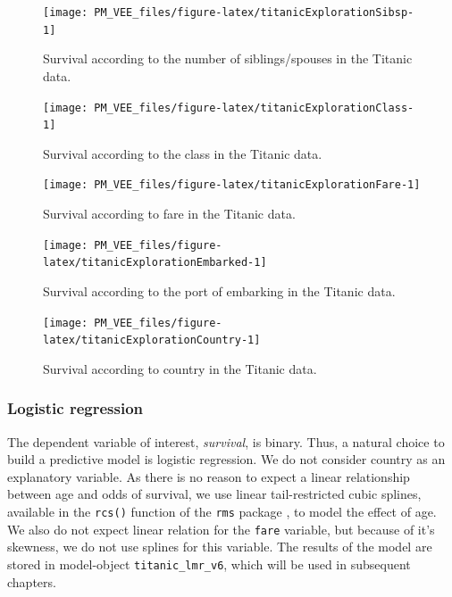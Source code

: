 \documentclass[12pt,]{krantz}
\begin{document}
\begin{figure}

{\centering \texttt{[image: PM\_VEE\_files/figure-latex/titanicExplorationSibsp-1]} 

}

\caption{Survival according to the number of siblings/spouses in the Titanic data.}\label{fig:titanicExplorationSibsp}
\end{figure}
\begin{figure}

{\centering \texttt{[image: PM\_VEE\_files/figure-latex/titanicExplorationClass-1]} 

}

\caption{Survival according to the class in the Titanic data.}\label{fig:titanicExplorationClass}
\end{figure}

\begin{figure}

{\centering \texttt{[image: PM\_VEE\_files/figure-latex/titanicExplorationFare-1]} 

}

\caption{Survival according to fare in the Titanic data.}\label{fig:titanicExplorationFare}
\end{figure}

\begin{figure}

{\centering \texttt{[image: PM\_VEE\_files/figure-latex/titanicExplorationEmbarked-1]} 

}

\caption{Survival according to the port of embarking in the Titanic data.}\label{fig:titanicExplorationEmbarked}
\end{figure}

\begin{figure}

{\centering \texttt{[image: PM\_VEE\_files/figure-latex/titanicExplorationCountry-1]} 

}

\caption{Survival according to country in the Titanic data.}\label{fig:titanicExplorationCountry}
\end{figure}

\hypertarget{model-titanic-lmr}{%
\subsubsection{Logistic regression}\label{model-titanic-lmr}}

The dependent variable of interest, \emph{survival}, is binary. Thus, a natural choice to build a predictive model is logistic regression. We do not consider country as an explanatory variable. As there is no reason to expect a linear relationship between age and odds of survival, we use linear tail-restricted cubic splines, available in the \texttt{rcs()} function of the \texttt{rms} package \citep{rms}, to model the effect of age. We also do not expect linear relation for the \texttt{fare} variable, but because of it's skewness, we do not use splines for this variable. The results of the model are stored in model-object \texttt{titanic\_lmr\_v6}, which will be used in subsequent chapters.
\end{document}

